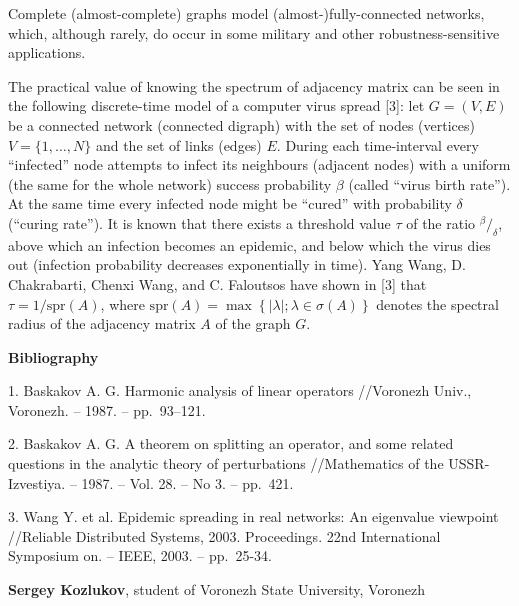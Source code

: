 \documentclass[11pt]{article}
\begin{document}
Complete (almost-complete) graphs model (almost-)fully-connected networks,
which, although rarely, do
occur in some military and other robustness-sensitive applications.

The practical value of knowing the spectrum of adjacency matrix
can be seen in the following discrete-time model of a computer virus spread [3]:
let \( G = (V, E) \) be a connected network (connected digraph)
with the set of nodes (vertices) \( V = \{1, \ldots, N\} \)
and the set of links (edges) \( E \).
During each time-interval every ``infected'' node
attempts to infect its neighbours (adjacent nodes)
with a uniform (the same for the whole network) success probability \( \beta \) (called ``virus birth rate'').
At the same time every infected node might be ``cured'' with probability \( \delta \) (``curing rate'').
It is known that there exists a threshold value \( \tau \) of the ratio \( {^\beta}/_{\delta} \),
above which an infection becomes an epidemic,
and below which the virus dies out (infection probability decreases exponentially in time).
Yang Wang, D. Chakrabarti, Chenxi Wang, and C. Faloutsos have shown in [3]
that \( \tau = 1/\mathrm{spr}\left({A}\right) \),
where \( \mathrm{spr}\left({A}\right) = \max\left\{\lvert \lambda\rvert; \lambda\in\sigma\left(A\right) \right\} \)
denotes the spectral radius of the adjacency matrix \( A \) of the graph \( G \).

\centerline{\textbf{Bibliography}}

1. Baskakov A. G. Harmonic analysis of linear operators //Voronezh Univ., Voronezh. – 1987. -- pp.~93--121.

2. Baskakov A. G. A theorem on splitting an operator, and some related questions in the analytic theory of perturbations
   //Mathematics of the USSR-Izvestiya. – 1987. – Vol. 28. – No 3. – pp.~421.

3. Wang Y. et al. Epidemic spreading in real networks: An eigenvalue viewpoint
   //Reliable Distributed Systems, 2003. Proceedings. 22nd International Symposium on. – IEEE, 2003. – pp.~25-34.



{\bf Sergey Kozlukov}, student of Voronezh State University, Voronezh
\end{document}
